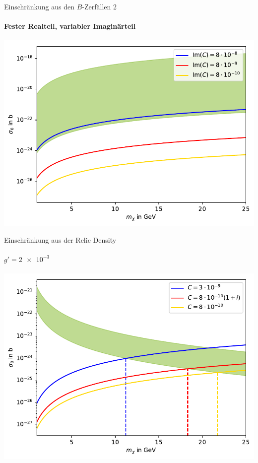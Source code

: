 \begin{frame}{Einschränkung aus den $B$-Zerfällen 2}
\framesubtitle{Fester Realteil, variabler Imaginärteil}
\includegraphics[width=\textwidth]{Bilder/Im11.pdf}
\end{frame}


\begin{frame}{Einschränkung aus der Relic Density}
\framesubtitle{$g'=\SI{2e-3}{}$}
\includegraphics[width=\textwidth]{Bilder/Relic11.pdf}
\end{frame}
